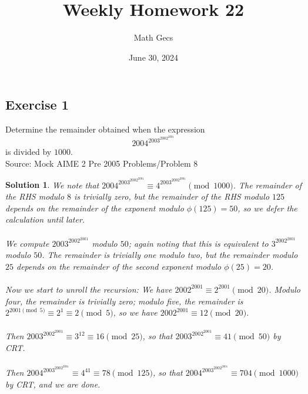 \documentclass[12pt]{article}
\title{Weekly Homework 22}
\author{Math Gecs}
\date{June 30, 2024}
\newtheorem*{solution*}{Solution}
\begin{document}
\maketitle

\subsection*{Exercise 1}
Determine the remainder obtained when the expression\[2004^{2003^{2002^{2001}}}\]is divided by $1000$.\\

Source: Mock AIME 2 Pre 2005 Problems/Problem 8\\

\begin{solution*}
We note that $2004^{2003^{2002^{2001}}} \equiv 4^{2003^{2002^{2001}}}\pmod{1000}$. The remainder of the RHS modulo $8$ is trivially zero, but the remainder of the RHS modulo $125$ depends on the remainder of the exponent modulo $\phi(125) = 50$, so we defer the calculation until later.
\\ \\
We compute $2003^{2002^{2001}}$ modulo $50$; again noting that this is equivalent to $3^{2002^{2001}}$ modulo $50$. The remainder is trivially one modulo two, but the remainder modulo $25$ depends on the remainder of the second exponent modulo $\phi(25) = 20$.
\\ \\
Now we start to unroll the recursion: We have $2002^{2001} \equiv 2^{2001} \pmod{20}$. Modulo four, the remainder is trivially zero; modulo five, the remainder is $2^{2001\pmod{5}} \equiv 2^1 \equiv 2\pmod{5}$, so we have $2002^{2001} \equiv 12\pmod{20}$.
\\ \\
Then $2003^{2002^{2001}} \equiv 3^{12} \equiv 16 \pmod{25}$, so that $2003^{2002^{2001}} \equiv 41\pmod{50}$ by CRT.
\\ \\
Then $2004^{2003^{2002^{2001}}} \equiv 4^{41} \equiv 78\pmod{125}$, so that $2004^{2003^{2002^{2001}}} \equiv 704 \pmod{1000}$ by CRT, and we are done.
\end{solution*}
\end{document}
